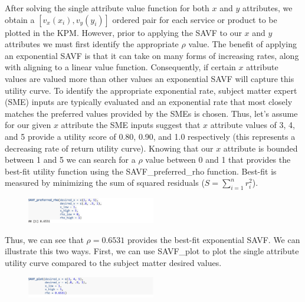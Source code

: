 \documentclass[twocolumn]{svjour3}       %
\begin{document}
After solving the single attribute value function for both $x$ and $y$ attributes, we obtain a $\left[v_x\left(x_i\right), v_y\left(y_i\right)\right]$ ordered pair for each service or product to be plotted in the KPM.  However, prior to applying the SAVF to our $x$ and $y$ attributes we must first identify the appropriate $\rho$ value. The benefit of applying an exponential SAVF is that it can take on many forms of increasing rates, along with aligning to a linear value function. Consequently, if certain $x$ attribute values are valued more than other values an exponential SAVF will capture this utility curve. To identify the appropriate exponential rate, subject matter expert (SME) inputs are typically evaluated and an exponential rate that most closely matches the preferred values provided by the SMEs is chosen. Thus, let's assume for our given $x$ attribute the SME inputs suggest that $x$ attribute values of 3, 4, and 5 provide a utility score of 0.80, 0.90, and 1.0 respectively (this represents a decreasing rate of return utility curve). Knowing that our $x$ attribute is bounded between 1 and 5 we can search for a $\rho$ value between 0 and 1 that provides the best-fit utility function using the SAVF\_preferred\_rho function.  Best-fit is measured by minimizing the sum of squared residuals ($S = \sum_{i = 1}^n r_i ^ 2$).
\begin{figure}[!htb]
  \includegraphics[width=0.5\textwidth]{code5.png}
\end{figure}

Thus, we can see that $\rho = 0.6531$ provides the best-fit exponential SAVF. We can illustrate this two ways. First, we can use SAVF\_plot to plot the single attribute utility curve compared to the subject matter desired values.
\begin{figure}[!htb]
  \includegraphics[width=0.5\textwidth]{code6.png}
\end{figure}
\end{document}
